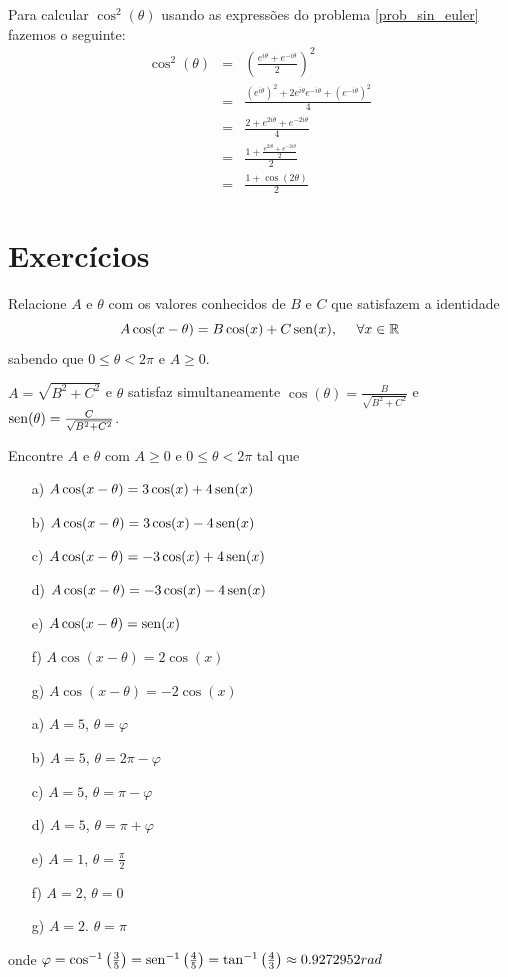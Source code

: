 \begin{ex}Para calcular $\cos^2(\theta)$ usando as expressões do problema \ref{prob_sin_euler} fazemos o seguinte:
\begin{eqnarray*}
\cos^2(\theta)&=&\left(\frac{e^{i\theta}+e^{-i\theta}}{2}\right)^2\\
&=&\frac{\left(e^{i\theta}\right)^2+2e^{i\theta}e^{-i\theta}+\left(e^{-i\theta}\right)^2}{4}\\
&=&\frac{2+e^{2i\theta}+e^{-2i\theta}}{4}\\
&=&\frac{1+\frac{e^{2i\theta}+e^{-2i\theta}}{2}}{2}\\
&=&\frac{1+\cos(2\theta)}{2}
\end{eqnarray*}
\end{ex}
\section{Exercícios}
\begin{Exercise}
Relacione $A$ e $\theta$ com os valores conhecidos de $B$ e $C$ que satisfazem a identidade
$$A\cos(x-\theta)=B\cos(x)+C\operatorname{sen}(x),~~~~\forall x\in\mathbb{R}$$
sabendo que $0\leq \theta<2\pi$ e $A\geq 0$.
\end{Exercise}
\begin{Answer}
$A=\sqrt{B^2+C^2}$ e $\theta$ satisfaz simultaneamente $\cos(\theta)=\frac{B}{\sqrt{B^2+C^2}}$ e $\operatorname{sen}(\theta)=\frac{C}{\sqrt{B^2+C^2}}$.
\end{Answer}
\begin{Exercise} Encontre $A$ e $\theta$ com $A\geq 0$ e  $0\leq \theta<2\pi$ tal que
\begin{itemize}
 \item [a)] $A\cos(x-\theta)=3\cos(x)+4\operatorname{sen}(x)$
 \item [b)] $A\cos(x-\theta)=3\cos(x)-4\operatorname{sen}(x)$
 \item [c)] $A\cos(x-\theta)=-3\cos(x)+4\operatorname{sen}(x)$
 \item [d)] $A\cos(x-\theta)=-3\cos(x)-4\operatorname{sen}(x)$
 \item [e)] $A\cos(x-\theta)=\operatorname{sen}(x)$
 \item [f)] $A\cos(x-\theta)=2\cos(x)$
 \item [g)] $A\cos(x-\theta)=-2\cos(x)$
 \end{itemize}
\end{Exercise}
\begin{Answer}
\begin{itemize}
 \item [a)] $A=5$, $\theta=\varphi$
 \item [b)] $A=5$, $\theta=2\pi-\varphi$
 \item [c)] $A=5$, $\theta=\pi-\varphi$
 \item [d)] $A=5$, $\theta=\pi+\varphi$
 \item [e)] $A=1$, $\theta=\frac{\pi}{2}$
 \item [f)] $A=2$, $\theta=0$
 \item [g)] $A=2$. $\theta=\pi$
 \end{itemize}
 onde $\varphi=\cos^{-1}\left(\frac{3}{5}\right)=\operatorname{sen}^{-1}\left(\frac{4}{5}\right)=\tan^{-1}\left(\frac{4}{3}\right)\approx 0.9272952rad $
\end{Answer}
